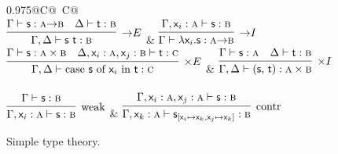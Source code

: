 \begin{figure}
	\centering
	\begin{tabularx}{0.975\textwidth}{@{}C@{~}C@{}}
		\\[2em]
		$\infer[\ii E]{\Gamma, \Delta \vdash \term{s~t} : \prop b}{\Gamma \vdash \term{s} : \prop{a} \ii \prop{b} & \Delta \vdash \term{t} : \prop{b}}$ 
		& 
		$\infer[\ii I]{\Gamma \vdash \term{\lam \vari .s} : \prop a \ii \prop{b}}{\Gamma, \term{\vari }: \prop{a} \vdash \term{s}:\prop{b}}$\\[2em]
		$\infer[\times E]
			{\Gamma,\Delta \vdash
			\caseof{s}{\vari}{t}: \prop{c}}
			{\Gamma \vdash \term{s}: \prop{a} \times \prop{b} & 
			\Delta, \term{\vari }: \prop{a} , \term{\varj}: \prop{b} \vdash \term{t}: \prop{c}}$ 
		&
		$\infer[\times I]
			{\Gamma, \Delta \vdash \cterm{(\term{s}, \term{t})}: \prop{a} \times \prop{b}}
			{\Gamma \vdash \term{s}: \prop{a} & \Delta \vdash \term{t}:\prop{b}}$\\[\smallsep]
		\\[2em]
		$\infer[\Weakening{}]
			{\Gamma, \term{\vari }: \prop{a} \vdash \term{s}: \prop{b}}
			{\Gamma \vdash \term{s}:\prop{b}} $ 
		&
		$\infer[\Contraction{}]
			{\Gamma, \term{\vark}: \prop{a} \vdash \term{s}_{[\term{\vari } \mapsto \term{\vark}, \term{\varj} \mapsto \term{\vark}]}:\prop{b}}
			{\Gamma,  \term{\vari }: \prop{a}, \term{\varj}: \prop{a} \vdash \term{s}: \prop{b}}$
		\end{tabularx}
	\caption{Simple type theory.}
	\label{figure:simple_type_theory}
\end{figure}


